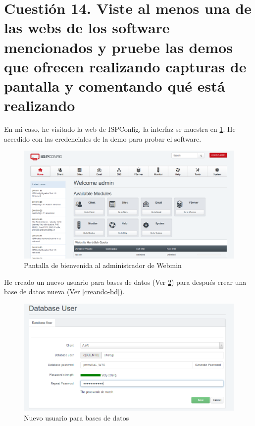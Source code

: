 \section{Cuestión 14. Viste al menos una de las webs de los software mencionados y pruebe las demos que ofrecen realizando capturas de pantalla y comentando qué está realizando}

En mi caso, he visitado la web de ISPConfig, la interfaz se muestra en \ref{ispconfig-demo}. He accedido con las credenciales de la demo para probar el software.

\begin{figure}[H]
	\centering
	\includegraphics[scale=0.45]{ispconfig-demo.png}
	\caption{Pantalla de bienvenida al administrador de Webmin} \label{ispconfig-demo}
\end{figure}

He creado un nuevo usuario para bases de datos (Ver \ref{nuevo_usuario_bd}) para después crear una base de datos nueva (Ver \ref{creando-bd}).

\begin{figure}[H]
	\centering
	\includegraphics[scale=0.6]{nuevo-usuario-bd.png}
	\caption{Nuevo usuario para bases de datos} \label{nuevo_usuario_bd}
\end{figure}

